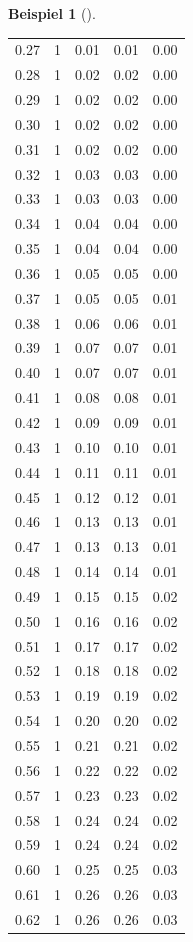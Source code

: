 \documentclass[
  ngerman,
  letterpaper,
  twoside,
  open=any]{scrbook}
\theoremstyle{definition}
\newtheorem{example}{Beispiel}[chapter]
\theoremstyle{plain}
\theoremstyle{definition}
\theoremstyle{definition}
\theoremstyle{remark}
\begin{document}
\begin{example}[]
{\begin{longtable}[]{@{}rrrrr@{}}
0.27 & 1 & 0.01 & 0.01 & 0.00 \\
0.28 & 1 & 0.02 & 0.02 & 0.00 \\
0.29 & 1 & 0.02 & 0.02 & 0.00 \\
0.30 & 1 & 0.02 & 0.02 & 0.00 \\
0.31 & 1 & 0.02 & 0.02 & 0.00 \\
0.32 & 1 & 0.03 & 0.03 & 0.00 \\
0.33 & 1 & 0.03 & 0.03 & 0.00 \\
0.34 & 1 & 0.04 & 0.04 & 0.00 \\
0.35 & 1 & 0.04 & 0.04 & 0.00 \\
0.36 & 1 & 0.05 & 0.05 & 0.00 \\
0.37 & 1 & 0.05 & 0.05 & 0.01 \\
0.38 & 1 & 0.06 & 0.06 & 0.01 \\
0.39 & 1 & 0.07 & 0.07 & 0.01 \\
0.40 & 1 & 0.07 & 0.07 & 0.01 \\
0.41 & 1 & 0.08 & 0.08 & 0.01 \\
0.42 & 1 & 0.09 & 0.09 & 0.01 \\
0.43 & 1 & 0.10 & 0.10 & 0.01 \\
0.44 & 1 & 0.11 & 0.11 & 0.01 \\
0.45 & 1 & 0.12 & 0.12 & 0.01 \\
0.46 & 1 & 0.13 & 0.13 & 0.01 \\
0.47 & 1 & 0.13 & 0.13 & 0.01 \\
0.48 & 1 & 0.14 & 0.14 & 0.01 \\
0.49 & 1 & 0.15 & 0.15 & 0.02 \\
0.50 & 1 & 0.16 & 0.16 & 0.02 \\
0.51 & 1 & 0.17 & 0.17 & 0.02 \\
0.52 & 1 & 0.18 & 0.18 & 0.02 \\
0.53 & 1 & 0.19 & 0.19 & 0.02 \\
0.54 & 1 & 0.20 & 0.20 & 0.02 \\
0.55 & 1 & 0.21 & 0.21 & 0.02 \\
0.56 & 1 & 0.22 & 0.22 & 0.02 \\
0.57 & 1 & 0.23 & 0.23 & 0.02 \\
0.58 & 1 & 0.24 & 0.24 & 0.02 \\
0.59 & 1 & 0.24 & 0.24 & 0.02 \\
0.60 & 1 & 0.25 & 0.25 & 0.03 \\
0.61 & 1 & 0.26 & 0.26 & 0.03 \\
0.62 & 1 & 0.26 & 0.26 & 0.03 \\

\end{longtable}}
\end{example}
\end{document}
